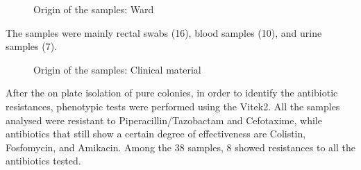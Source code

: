 \documentclass[11pt]{report}
\begin{document}
\begin{figure}[h!]
\centering
{}
\caption{Origin of the samples: Ward}
\end{figure}

The samples were mainly rectal swabs (16), blood samples (10), and urine samples (7).

\begin{figure}[h!]
\centering
{}
\caption{Origin of the samples: Clinical material}
\end{figure}

\clearpage

After the on plate isolation of pure colonies, in order to identify the antibiotic resistances, phenotypic tests were performed using the Vitek2.
All the samples analysed were resistant to Piperacillin/Tazobactam and Cefotaxime, while antibiotics that still show a certain degree of effectiveness are Colistin, Fosfomycin, and Amikacin.
Among the 38 samples, 8 showed resistances to all the antibiotics tested.
\end{document}
